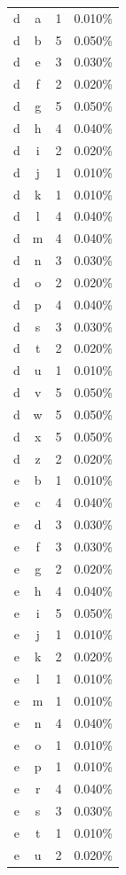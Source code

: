 \begin{longtable}{cccc}
    d & a & 1 & 0.010\% \\
    d & b & 5 & 0.050\% \\
    d & e & 3 & 0.030\% \\
    d & f & 2 & 0.020\% \\
    d & g & 5 & 0.050\% \\
    d & h & 4 & 0.040\% \\
    d & i & 2 & 0.020\% \\
    d & j & 1 & 0.010\% \\
    d & k & 1 & 0.010\% \\
    d & l & 4 & 0.040\% \\
    d & m & 4 & 0.040\% \\
    d & n & 3 & 0.030\% \\
    d & o & 2 & 0.020\% \\
    d & p & 4 & 0.040\% \\
    d & s & 3 & 0.030\% \\
    d & t & 2 & 0.020\% \\
    d & u & 1 & 0.010\% \\
    d & v & 5 & 0.050\% \\
    d & w & 5 & 0.050\% \\
    d & x & 5 & 0.050\% \\
    d & z & 2 & 0.020\% \\
    e & b & 1 & 0.010\% \\
    e & c & 4 & 0.040\% \\
    e & d & 3 & 0.030\% \\
    e & f & 3 & 0.030\% \\
    e & g & 2 & 0.020\% \\
    e & h & 4 & 0.040\% \\
    e & i & 5 & 0.050\% \\
    e & j & 1 & 0.010\% \\
    e & k & 2 & 0.020\% \\
    e & l & 1 & 0.010\% \\
    e & m & 1 & 0.010\% \\
    e & n & 4 & 0.040\% \\
    e & o & 1 & 0.010\% \\
    e & p & 1 & 0.010\% \\
    e & r & 4 & 0.040\% \\
    e & s & 3 & 0.030\% \\
    e & t & 1 & 0.010\% \\
    e & u & 2 & 0.020\% \\

\end{longtable}
